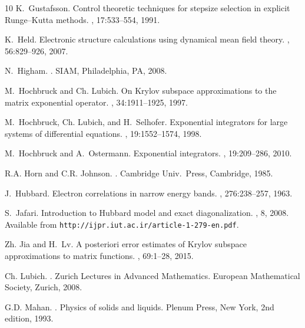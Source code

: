 \documentclass[smallextended]{svjour3pre}%
\numberwithin{equation}{section}
\numberwithin{figure}{section}
\numberwithin{table}{section}
\begin{document}
\begin{thebibliography}{10}
K.~Gustafsson.
\newblock Control theoretic techniques for stepsize selection in explicit
  {R}unge--{K}utta methods.
, 17:533--554, 1991.

K.~Held.
\newblock Electronic structure calculations using dynamical mean field theory.
, 56:829--926, 2007.

N.~Higham.
.
\newblock SIAM, Philadelphia, PA, 2008.

M.~Hochbruck and Ch. Lubich.
\newblock On {K}rylov subspace approximations to the matrix exponential
  operator.
, 34:1911--1925, 1997.

M.~Hochbruck, Ch. Lubich, and H.~Selhofer.
\newblock Exponential integrators for large systems of differential equations.
, 19:1552--1574, 1998.

M.~Hochbruck and A.~Ostermann.
\newblock Exponential integrators.
, 19:209--286, 2010.

R.A. Horn and C.R. Johnson.
.
\newblock Cambridge Univ.~Press, Cambridge, 1985.

J.~Hubbard.
\newblock Electron correlations in narrow energy bands.
, 276:238--257, 1963.

S.~Jafari.
\newblock Introduction to {H}ubbard model and exact diagonalization.
, 8, 2008.
\newblock Available from \texttt{http://ijpr.iut.ac.ir/article-1-279-en.pdf}.

Zh. Jia and H.~Lv.
\newblock A posteriori error estimates of {K}rylov subspace approximations to
  matrix functions.
, 69:1--28, 2015.

Ch. Lubich.
.
\newblock Zurich Lectures in Advanced Mathematics. European Mathematical
  Society, Zurich, 2008.

G.D. Mahan.
.
\newblock Physics of solids and liquids. Plenum Press, New York, 2nd edition,
  1993.


\end{thebibliography}
\end{document}
